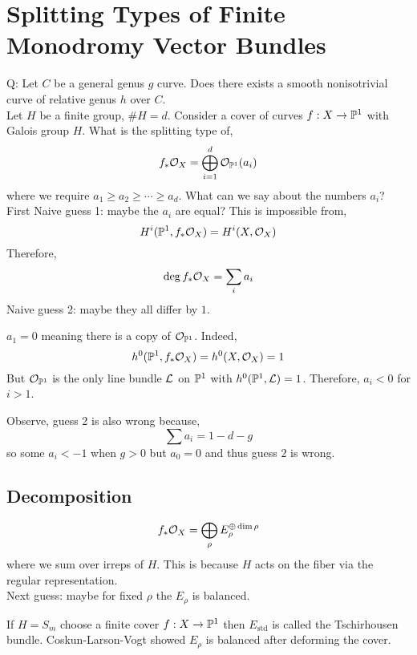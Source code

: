 \documentclass[12pt]{article}
\begin{document}
\section{Splitting Types of Finite Monodromy Vector Bundles}

Q: Let $C$ be a general genus $g$ curve. Does there exists a smooth nonisotrivial curve of relative genus $h$ over $C$.
\bigskip\\
Let $H$ be a finite group, $\# H = d$. Consider a cover of curves $f : X \to \P^1$ with Galois group $H$. What is the splitting type of,
\[ f_* \struct{X} = \bigoplus_{i = 1}^d \struct{\P^1}(a_i) \]
where we require $a_1 \ge a_2 \ge \cdots \ge a_d$. What can we say about the numbers $a_i$? 
\bigskip\\
First Naive guess 1: maybe the $a_i$ are equal? This is impossible from,
\[ H^i(\P^1, f_* \struct{X}) = H^i(X, \struct{X}) \]
Therefore,
\[ \deg{f_* \struct{X}} = \sum_i a_i \]
Naive guess 2: maybe they all differ by $1$. 

\begin{rmk}
$a_1 = 0$ meaning there is a copy of $\struct{\P^1}$. Indeed,
\[ h^0(\P^1, f_*  \struct{X}) = h^0(X, \struct{X}) = 1 \]
But $\struct{\P^1}$ is the only line bundle $\L$ on $\P^1$ with $h^0(\P^1, \L) = 1$. Therefore, $a_i < 0$ for $i > 1$. 
\end{rmk}

\begin{rmk}
Observe, guess 2 is also wrong because,
\[ \sum a_i = 1 - d - g \]
so some $a_i < -1$ when $g > 0$ but $a_0 = 0$ and thus guess $2$ is wrong. 
\end{rmk}

\subsection{Decomposition}

\[ f_* \struct{X} = \bigoplus_{\rho} E_\rho^{\oplus \dim{\rho}} \]
where we sum over irreps of $H$. This is because $H$ acts on the fiber via the regular representation. 
\bigskip\\
Next guess: maybe for fixed $\rho$ the $E_\rho$ is balanced. 

\begin{example}
If $H = S_m$ choose a finite cover $f : X \to \P^1$ then $E_\text{std}$ is called the Tschirhousen bundle. Coskun-Larson-Vogt showed $E_\rho$ is balanced after deforming the cover. 
\end{example}
\end{document}
